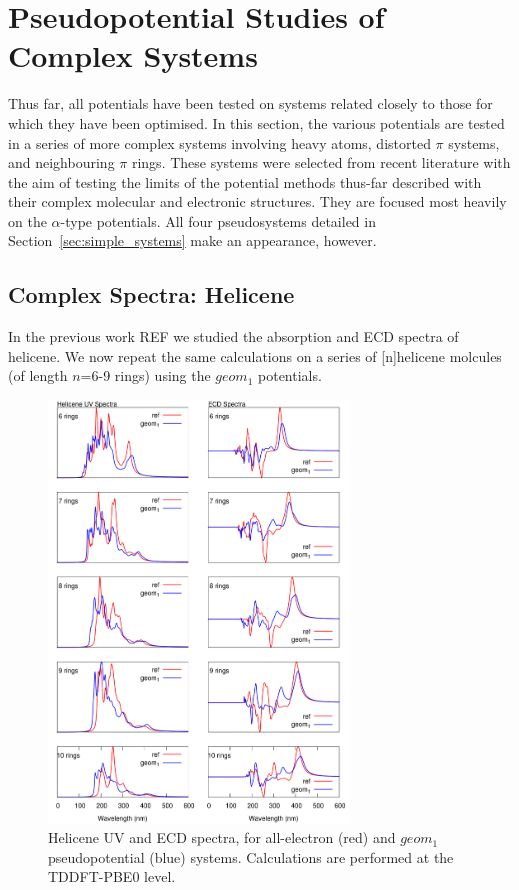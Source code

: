 \documentclass[aip,reprint,nofootinbib]{revtex4-1}
\begin{document}
\section{Pseudopotential Studies of Complex Systems}

Thus far, all potentials have been tested on systems related closely to those for which they have been optimised. In this section, the various potentials are tested in a series of more complex systems involving heavy atoms, distorted $\pi$ systems, and neighbouring $\pi$ rings. These systems were selected from recent literature with the aim of testing the limits of the potential methods thus-far described with their complex molecular and electronic structures. They are focused most heavily on the $\alpha$-type potentials. All four pseudosystems detailed in Section~\ref{sec:simple_systems} make an appearance, however.

\subsection{Complex Spectra: Helicene}
\label{sec:helicene}

In the previous work REF we studied the absorption and ECD spectra of helicene. We now repeat the same calculations on a series of [n]helicene molcules (of length $n$=6-9 rings) using the $geom_1$ potentials.

\begin{figure}
\begin{center}
\includegraphics[width=8cm]{pbe0_grand_rpas_geom1.png}
\end{center}
\caption[Computed all-electron and pseudopotential spectra for helicenes: $geom_1$]{Helicene UV and ECD spectra, for all-electron (red) and $geom_1$ pseudopotential (blue) systems. Calculations are performed at the TDDFT-PBE0 level.}\label{fig:helispectrageom1}
\end{figure}
\end{document}
